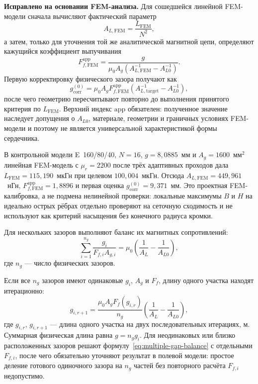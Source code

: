 \documentclass[14pt,a4paper]{extarticle}
\begin{document}
\textbf{Исправлено на основании FEM-анализа.} Для сошедшейся линейной
FEM-модели сначала вычисляют фактический параметр
\begin{equation}
 A_{L,\mathrm{FEM}}=\frac{L_{\mathrm{FEM}}}{N^2},
 \label{eq:al-from-fem}
\end{equation}
а затем, только для уточнения той же аналитической магнитной цепи,
определяют кажущийся коэффициент выпучивания
\begin{equation}
 F_{f,\mathrm{FEM}}^{\mathrm{app}}=
 \frac{g}{\mu_0A_g\left(
 A_{L,\mathrm{FEM}}^{-1}-A_{L0}^{-1}\right)}.
 \label{eq:fringing-from-fem}
\end{equation}
Первую корректировку физического зазора получают как
\begin{equation}
 g_{\mathrm{corr}}^{(0)}=\mu_0A_gF_{f,\mathrm{FEM}}^{\mathrm{app}}
 \left(A_{L,\mathrm{target}}^{-1}-A_{L0}^{-1}\right),
 \label{eq:gap-correction-from-fem}
\end{equation}
после чего геометрию пересчитывают повторно до выполнения принятого
критерия по $L_{\mathrm{FEM}}$. Верхний индекс $\mathrm{app}$ обязателен:
полученное значение наследует допущения о $A_{L0}$, материале, геометрии и
граничных условиях FEM-модели и поэтому не является универсальной
характеристикой формы сердечника.

В контрольной модели E~160/80/40, $N=16$, $g=8{,}0885$~мм и
$A_g=1600$~мм$^2$ линейная FEM-модель с $\mu_r=2200$ после трёх
адаптивных проходов дала $L_{\mathrm{FEM}}=115{,}190$~мкГн при целевом
$100{,}004$~мкГн. Отсюда
$A_{L,\mathrm{FEM}}=449{,}961$~нГн,
$F_{f,\mathrm{FEM}}^{\mathrm{app}}=1{,}8896$ и первая оценка
$g_{\mathrm{corr}}^{(0)}=9{,}371$~мм. Это проектная FEM-калибровка, а не
подмена нелинейной проверки: локальные максимумы $B$ и $H$ на идеально
острых рёбрах отдельно проверяют на сеточную сходимость и не используют
как критерий насыщения без конечного радиуса кромки.

Для нескольких зазоров выполняют баланс их магнитных сопротивлений:
\begin{equation}
 \sum_{i=1}^{n_g}
 \frac{g_i}{F_{f,i}A_{g,i}}=
 \mu_0\left(
 \frac{1}{A_L}-\frac{1}{A_{L0}}
 \right),
 \label{eq:multiple-gap-balance}
\end{equation}
где $n_g$ --- число физических зазоров.

Если все $n_g$ зазоров имеют одинаковые $g_i$, $A_g$ и $F_f$, длину одного
участка находят итерационно:
\begin{equation}
 g_{i,r+1}=\frac{\mu_0 A_g F_f(g_{i,r})}{n_g}
 \left(
 \frac{1}{A_L}-\frac{1}{A_{L0}}
 \right),
 \label{eq:gap-split}
\end{equation}
где $g_{i,r}$, $g_{i,r+1}$ --- длина одного участка на двух
последовательных итерациях, м. Суммарная физическая длина равна
$g=n_g g_i$. Для неодинаковых или близко расположенных зазоров решают
формулу~\eqref{eq:multiple-gap-balance} с отдельными $F_{f,i}$, после чего
обязательно уточняют результат в полевой модели: простое деление готового
одиночного зазора на $n_g$ частей без повторного расчёта $F_{f,i}$
недопустимо.
\end{document}

